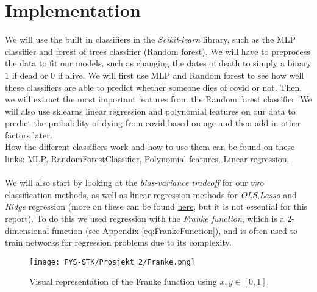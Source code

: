 \documentclass[english,notitlepage,reprint,nofootinbib]{revtex4-1}  %
\begin{document}
\section{Implementation}\label{sec: IMPLEMENTATION}
We will use the built in classifiers in the \emph{Scikit-learn} library, such as the MLP classifier and forest of trees classifier (Random forest). We will have to preprocess the data to fit our models, such as changing the dates of death to simply a binary $1$ if dead or $0$ if alive. We will first use MLP and Random forest to see how well these classifiers are able to predict whether someone dies of covid or not. Then, we will extract the most important features from the Random forest classifier. We will also use sklearns linear regression and polynomial features on our data to predict the probability of dying from covid based on age and then add in other factors later. 
\\
How the different classifiers work and how to use them can be found on these links: 
\href{https://scikit-learn.org/stable/modules/generated/sklearn.neural_network.MLPClassifier.html}{MLP},
\href{https://scikit-learn.org/stable/modules/generated/sklearn.ensemble.RandomForestClassifier.html}{RandomForestClassifier},
\href{https://scikit-learn.org/stable/modules/generated/sklearn.preprocessing.PolynomialFeatures.html}{Polynomial features},
\href{https://scik,it-learn.org/stable/modules/generated/sklearn.linear_model.LinearRegression.html}{Linear regression}.
\\
\\
We will also start by looking at the \textit{bias-variance tradeoff} for our two classification methods, as well as linear regression methods for \textit{OLS},\textit{Lasso} and \textit{Ridge} regression (more on these can be found \href{https://github.com/mathiasmellemstuen/FYS-STK4155-Prosjekt-1}{here}, but it is not essential for this report). To do this we used regression with the \textit{Franke function}, which is a $2$-dimensional function (see Appendix \ref{eq:FrankeFunction}), and is often used to train networks for regression problems due to its complexity. 

\begin{figure}[H]
    \centering
    \texttt{[image: FYS-STK/Prosjekt\_2/Franke.png]}
    \caption{Visual representation of the Franke function using $x,y \in [0,1]$.}
    \label{fig: 3}
\end{figure}
\end{document}

